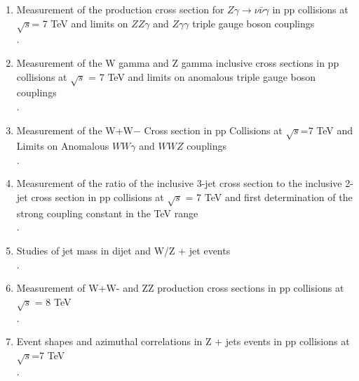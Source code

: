 \documentclass [12pt]{report}
\begin{document}
\begin{enumerate}
\item Measurement of the production cross section for $Z\gamma \rightarrow \nu\bar{\nu}\gamma$ in pp collisions at $\sqrt{s}$= 7 TeV and limits on $ZZ\gamma$ and $Z\gamma\gamma$ triple gauge boson couplings \\
.

\item Measurement of the W gamma and Z gamma inclusive cross sections in pp collisions at $\sqrt{s}$ = 7 TeV and limits on anomalous triple gauge boson couplings\\
.

\item Measurement of the W+W− Cross section in pp Collisions at $\sqrt{s}$=7 TeV and Limits on Anomalous $WW\gamma$ and $WWZ$ couplings\\
.

\item Measurement of the ratio of the inclusive 3-jet cross section to the inclusive 2-jet cross section in pp collisions at $\sqrt{s}$ = 7 TeV and first determination of the strong coupling constant in the TeV range\\
.

\item Studies of jet mass in dijet and W/Z + jet events\\
.

\item Measurement of W+W- and ZZ production cross sections in pp collisions at $\sqrt{s}$ = 8 TeV\\
.

\item Event shapes and azimuthal correlations in Z + jets events in pp collisions at $\sqrt{s}$=7 TeV\\
.


\end{enumerate}
\end{document}
